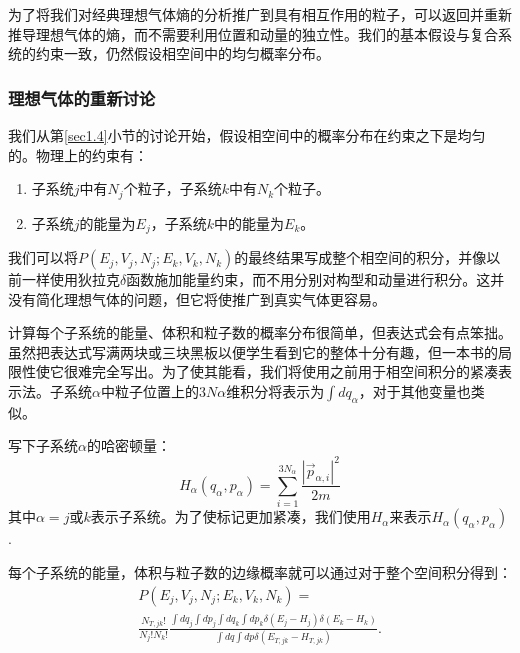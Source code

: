 \documentclass[UTF8]{ctexart}
\numberwithin{equation}{section}%
\numberwithin{figure}{section}%
\begin{document}
    为了将我们对经典理想气体熵的分析推广到具有相互作用的粒子，可以返回并重新推导理想气体的熵，而不需要利用位置和动量的独立性。我们的基本假设与复合系统的约束一致，仍然假设相空间中的均匀概率分布。
    \subsubsection{理想气体的重新讨论}
    我们从第\ref{sec1.4}小节的讨论开始，假设相空间中的概率分布在约束之下是均匀的。物理上的约束有：
    \begin{enumerate}
        \item 子系统$j$中有$N_j$个粒子，子系统$k$中有$N_k$个粒子。
        \item 子系统$j$的能量为$E_j$，子系统$k$中的能量为$E_k$。
    \end{enumerate}

    我们可以将$P\left(E_{j}, V_{j}, N_{j} ; E_{k}, V_{k}, N_{k}\right)$的最终结果写成整个相空间的积分，并像以前一样使用狄拉克$\delta$函数施加能量约束，而不用分别对构型和动量进行积分。这并没有简化理想气体的问题，但它将使推广到真实气体更容易。

    计算每个子系统的能量、体积和粒子数的概率分布很简单，但表达式会有点笨拙。虽然把表达式写满两块或三块黑板以便学生看到它的整体十分有趣，但一本书的局限性使它很难完全写出。为了使其能看，我们将使用之前用于相空间积分的紧凑表示法。子系统$\alpha$中粒子位置上的$3N\alpha$维积分将表示为$\int dq_\alpha$，对于其他变量也类似。

    写下子系统$\alpha$的哈密顿量：
    \begin{equation}
        H_{\alpha}\left(q_{\alpha}, p_{\alpha}\right)=\sum_{i=1}^{3 N_{\alpha}} \frac{\left|\vec{p}_{\alpha, i}\right|^{2}}{2 m}
    \end{equation}
    其中$\alpha=j\text{或}k$表示子系统。为了使标记更加紧凑，我们使用$H_\alpha$来表示$H_\alpha(q_\alpha,p_\alpha)$.

    每个子系统的能量，体积与粒子数的边缘概率就可以通过对于整个空间积分得到：
    \begin{equation}\label{eq7.29}
        \begin{gathered}
        P\left(E_{j}, V_{j}, N_{j} ; E_{k}, V_{k}, N_{k}\right)= \\
        \frac{N_{T, j k} !}{N_{j} ! N_{k} !} \frac{\int d q_{j} \int d p_{j} \int d q_{k} \int d p_{k} \delta\left(E_{j}-H_{j}\right) \delta\left(E_{k}-H_{k}\right)}{\int d q \int d p \delta\left(E_{T, j k}-H_{T, j k}\right)} .
        \end{gathered}
        \end{equation}
\end{document}
